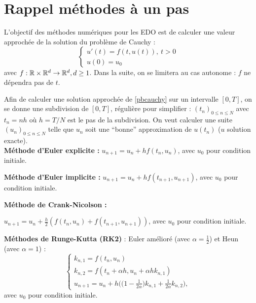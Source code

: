 \documentclass[a4paper,12pt,reqno]{amsart}
\begin{document}

\section{Rappel m\'ethodes \`a un pas}

L'objectif des m\'ethodes num\'eriques pour les EDO est de calculer une valeur approch\'ee de la solution du probl\`eme de Cauchy :
\begin{equation}\label{pbcauchy}
\left\{\begin{array}{l}
u'(t)=f(t,u(t)),\ t>0\\
u(0)=u_0
\end{array}
\right.
\end{equation}
avec $f:\mathbb{R}\times\mathbb{R}^d\to \mathbb{R}^d, d\geq 1$.
Dans la suite, on se limitera au cas autonome : $f$ ne d\'ependra pas de $t$.

Afin de calculer une solution approch\'ee de \eqref{pbcauchy} sur un intervalle $[0,T]$, on se donne une
subdivision de $[0,T]$, r\'eguli\`ere pour simplifier :
$(t_n)_{0\leq n\leq N}$ avec $t_n=nh$ o\`u $h=T/N$ est le pas de la subdivision.  
On veut calculer une suite $(u_n)_{0\leq n\leq N}$ telle
que $u_n$ soit une ``bonne'' approximation de $u(t_n)$ ($u$ solution
exacte). \\

{\bf M\'ethode d'Euler explicite :}
$ u_{n+1}=u_n+h f(t_n,u_n)$, avec $u_0$ pour condition initiale.

{\bf M\'ethode d'Euler implicite :}
$ u_{n+1}=u_n+h f(t_{n+1},u_{n+1})$, avec $u_0$ pour condition initiale.

{\bf M\'ethode de Crank-Nicolson :}
\smallskip
\centerline{$
u_{n+1}=u_n+\frac{h}{2}  (f(t_n,u_n)+f(t_{n+1},u_{n+1}))$, avec $u_0$ pour condition initiale.} 

{\bf M\'ethodes de Runge-Kutta (RK2)} : Euler am\'elior\'e (avec $\alpha = \frac{1}{2}$) et Heun (avec $\alpha=1$) :
\smallskip
$$\left\{
\begin{array}{l}
k_{n,1}=f(t_n,u_n)\\
k_{n,2}=f(t_n+ \alpha h,u_n+\alpha h k_{n,1})\\
u_{n+1}=u_n+h \bigl( \bigl(1 - \frac{1}{2\alpha}\bigl) k_{n,1}+\frac{1}{2\alpha}k_{n,2}\bigl),
\end{array}\right.
$$
avec $u_0$ pour condition initiale.
\end{document}
